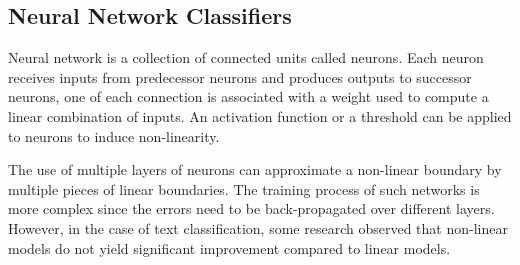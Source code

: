 \subsection{Neural Network Classifiers}
\par Neural network is a collection of connected units called neurons. Each neuron receives inputs from predecessor neurons and produces outputs to successor neurons, one of each connection is associated with a weight used to compute a linear combination of inputs. An activation function or a threshold can be applied to neurons to induce non-linearity.
\par The use of multiple layers of neurons can approximate a non-linear boundary by multiple pieces of linear boundaries. The training process of such networks is more complex since the errors need to be back-propagated over different layers\cite{yang1999mlall,lam1999nn,ruiz1999nn,weigend1999nn}. However, in the case of text classification, some research observed that non-linear models do not yield significant improvement compared to linear models\cite{schutze1995nn,wiener1995nn}.